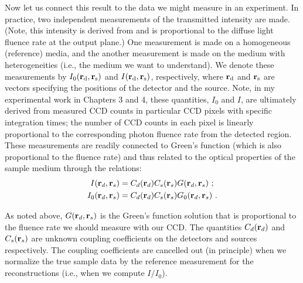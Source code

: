 Now let us connect this result to the data we might measure in an experiment. In practice, two independent measurements of the transmitted intensity are made. (Note, this intensity is derived from and is proportional to the diffuse light fluence rate at the output plane.) One measurement is made on a homogeneous (reference) media, and the another measurement is made on the medium with heterogeneities (i.e., the medium we want to understand). We denote these measurements by $I_0(\mathbf{r}_{\rm d}, \mathbf{r}_{\rm s})$ and $I(\mathbf{r}_{\rm d}, \mathbf{r}_{\rm s})$, respectively, where $\mathbf{r}_{\rm d}$ and $\mathbf{r}_{\rm s}$ are vectors specifying the positions of the detector and the source. Note, in my experimental work in Chapters 3 and 4, these quantities, $I_0$ and $I$, are ultimately derived from measured CCD counts in particular CCD pixels with specific integration times; the number of CCD counts in each pixel is linearly proportional to the corresponding photon fluence rate from the detected region. These measurements are readily connected to Green's function (which is also proportional to the fluence rate) and thus related to the optical properties of the sample medium through the relations:
\begin{align}
\label{eqn:Intensity1}
I(\mathbf{r}_d, \mathbf{r}_s) &= C_d(\mathbf{r}_d)C_s(\mathbf{r}_s)G(\mathbf{r}_d,\mathbf{r}_s) \ ; \\
\label{eqn:Intensity2}
I_0(\mathbf{r}_d, \mathbf{r}_s) &= C_d(\mathbf{r}_d)C_s(\mathbf{r}_s)G_0(\mathbf{r}_d,\mathbf{r}_s) \ .
\end{align}
\noindent

As noted above, $G(\mathbf{r}_d,\mathbf{r}_s)$ is the Green's function solution that is proportional to the fluence rate we should measure with our CCD. The quantities $C_d(\mathbf{r}_d)$ and $C_s(\mathbf{r}_s)$ are unknown coupling coefficients on the detectors and sources respectively. The coupling coefficients are cancelled out (in principle) when we normalize the true sample data by the reference measurement for the reconstructions (i.e., when we compute $I/I_0$).

